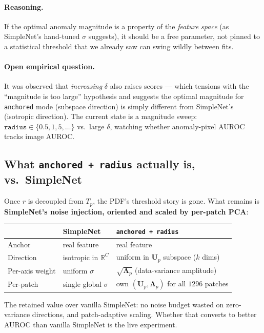 \documentclass[11pt]{article}
\newcommand{\code}[1]{\texttt{#1}}
\newcommand{\Up}{\mathbf{U}_p}
\newcommand{\bLambda}{\boldsymbol{\Lambda}}
\begin{document}
\paragraph{Reasoning.}
If the optimal anomaly magnitude is a property of the \emph{feature space} (as
SimpleNet's hand-tuned $\sigma$ suggests), it should be a free parameter, not
pinned to a statistical threshold that we already saw can swing wildly between
fits.

\paragraph{Open empirical question.}
It was observed that \emph{increasing} $\delta$ also raises scores --- which
tensions with the ``magnitude is too large'' hypothesis and suggests the optimal
magnitude for \code{anchored} mode (subspace direction) is simply different from
SimpleNet's (isotropic direction). The current state is a magnitude sweep:
$\code{radius} \in \{0.5, 1, 5, \dots\}$ vs.\ large $\delta$, watching whether
anomaly-pixel AUROC tracks image AUROC.

\subsection{What \code{anchored + radius} actually is, vs.\ SimpleNet}

Once $r$ is decoupled from $T_p$, the PDF's threshold story is gone. What remains
is \textbf{SimpleNet's noise injection, oriented and scaled by per-patch PCA}:

\begin{center}
\begin{tabular}{lll}
\toprule
 & SimpleNet & \code{anchored + radius} \\
\midrule
Anchor          & real feature              & real feature \\
Direction       & isotropic in $\mathbb{R}^C$ & uniform in $\Up$ subspace ($k$ dims) \\
Per-axis weight & uniform $\sigma$          & $\sqrt{\bLambda_p}$ (data-variance amplitude) \\
Per-patch       & single global $\sigma$    & own $(\Up, \bLambda_p)$ for all $1296$ patches \\
\bottomrule
\end{tabular}
\end{center}

\noindent
The retained value over vanilla SimpleNet: no noise budget wasted on
zero-variance directions, and patch-adaptive scaling. Whether that converts to
better AUROC than vanilla SimpleNet is the live experiment.
\end{document}
